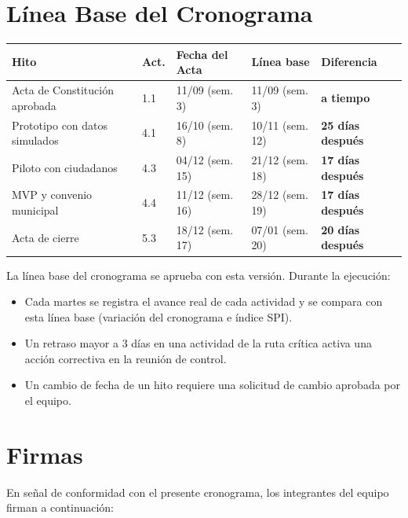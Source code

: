 \documentclass[11pt,a4paper]{article}
\begin{document}
\section{Línea Base del Cronograma}
{\small
{}
\noindent\begin{tabularx}{\textwidth}{@{}L C{0.9cm} C{2.75cm} C{2.75cm} C{2.3cm}@{}}
\toprule
{}
\textbf{Hito} & \textbf{Act.} & \textbf{Fecha del Acta} & \textbf{Línea base} & \textbf{Diferencia} \\
\midrule
Acta de Constitución aprobada & 1.1 & 11/09 (sem.\,3) & 11/09 (sem.\,3) & \textcolor{Rama4}{\textbf{a tiempo}} \\
Prototipo con datos simulados & 4.1 & 16/10 (sem.\,8) & 10/11 (sem.\,12) & \textcolor{RaciR}{\textbf{25 días después}} \\
Piloto con ciudadanos & 4.3 & 04/12 (sem.\,15) & 21/12 (sem.\,18) & \textcolor{RaciR}{\textbf{17 días después}} \\
MVP y convenio municipal & 4.4 & 11/12 (sem.\,16) & 28/12 (sem.\,19) & \textcolor{RaciR}{\textbf{17 días después}} \\
Acta de cierre & 5.3 & 18/12 (sem.\,17) & 07/01 (sem.\,20) & \textcolor{RaciR}{\textbf{20 días después}} \\
\bottomrule
\end{tabularx}
}

\vspace{0.2cm}
\noindent La línea base del cronograma se aprueba con esta versión. Durante la ejecución:
\begin{itemize}[leftmargin=*]
    \item Cada martes se registra el avance real de cada actividad y se compara con esta línea base (variación del cronograma e índice SPI).
    \item Un retraso mayor a 3 días en una actividad de la ruta crítica activa una acción correctiva en la reunión de control.
    \item Un cambio de fecha de un hito requiere una solicitud de cambio aprobada por el equipo.
\end{itemize}

\section{Firmas}
\noindent En señal de conformidad con el presente cronograma, los integrantes del equipo firman a continuación:
\end{document}
